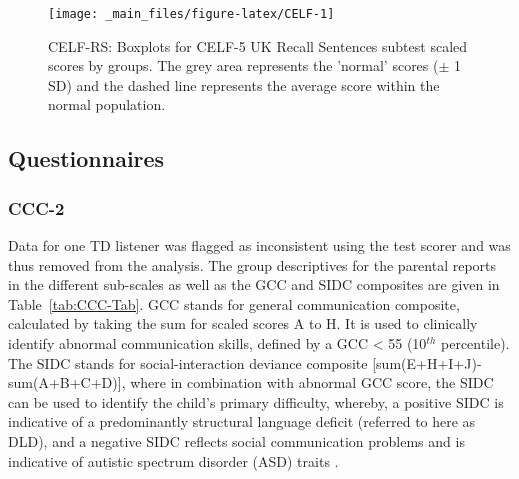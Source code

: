 \documentclass[a4paper, twoside]{templates/ociamthesis}
\begin{document}
\begin{figure}

{\centering \texttt{[image: \_main\_files/figure-latex/CELF-1]} 

}

\caption{CELF-RS: Boxplots for CELF-5 UK Recall Sentences subtest scaled scores by groups. The grey area represents the 'normal' scores ($\pm$ 1 SD) and the dashed line represents the average score within the normal population.}\label{fig:CELF}
\end{figure}

\hypertarget{questionnaires-1}{%
\subsection{Questionnaires}\label{questionnaires-1}}

\hypertarget{ccc-2}{%
\subsubsection{CCC-2}\label{ccc-2}}

Data for one TD listener was flagged as inconsistent using the test scorer and was thus removed from the analysis. The group descriptives for the parental reports in the different sub-scales as well as the GCC and SIDC composites are given in Table~\ref{tab:CCC-Tab}. GCC stands for general communication composite, calculated by taking the sum for scaled scores A to H. It is used to clinically identify abnormal communication skills, defined by a GCC \textless{} 55 (10\(^{th}\) percentile). The SIDC stands for social-interaction deviance composite {[}sum(E+H+I+J)-sum(A+B+C+D){]}, where in combination with abnormal GCC score, the SIDC can be used to identify the child's primary difficulty, whereby, a positive SIDC is indicative of a predominantly structural language deficit (referred to here as DLD), and a negative SIDC reflects social communication problems and is indicative of autistic spectrum disorder (ASD) traits \autocite{Norbury2014,Bishop2003}.\\
\end{document}
